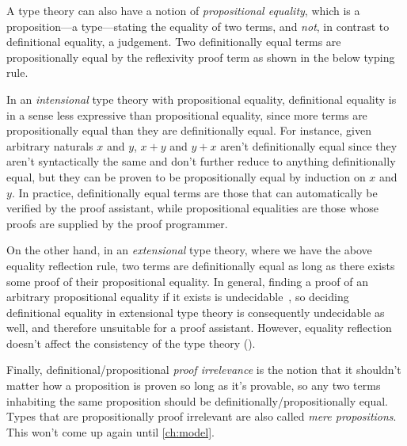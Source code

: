 A type theory can also have a notion of \emph{propositional equality},
which is a proposition---a type---stating the equality of two terms,
and \emph{not}, in contrast to definitional equality, a judgement.
Two definitionally equal terms are propositionally equal by the reflexivity proof term
as shown in the below typing rule.

In an \emph{intensional} type theory with propositional equality,
definitional equality is in a sense less expressive than propositional equality,
since more terms are propositionally equal than they are definitionally equal.
For instance, given arbitrary naturals $x$ and $y$,
$x + y$ and $y + x$ aren't definitionally equal since they aren't syntactically the same
and don't further reduce to anything definitionally equal,
but they can be proven to be propositionally equal by induction on $x$ and $y$.
In practice, definitionally equal terms are those that can automatically be verified by the proof assistant,
while propositional equalities are those whose proofs are supplied by the proof programmer.

\vspace{-0.5\baselineskip}

On the other hand, in an \emph{extensional} type theory, where we have the above equality reflection rule,
two terms are definitionally equal as long as there exists some proof of their propositional equality.
In general, finding a proof of an arbitrary propositional equality if it exists is undecidable~\citep{extensional-concepts},
so deciding definitional equality in extensional type theory is consequently undecidable as well,
and therefore unsuitable for a proof assistant.
However, equality reflection doesn't affect the consistency of the type theory (\cf \opcit).

Finally, definitional/propositional \emph{proof irrelevance}
is the notion that it shouldn't matter how a proposition is proven so long as it's provable,
so any two terms inhabiting the same proposition should be definitionally/propositionally equal.
Types that are propositionally proof irrelevant are also called \emph{mere propositions}.
This won't come up again until \cref{ch:model}.

